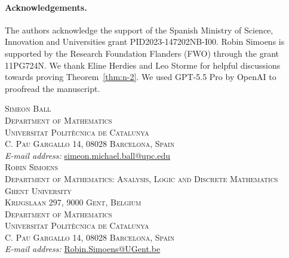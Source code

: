 \documentclass[a4paper]{article}
\theoremstyle{definition}
\begin{document}
\paragraph{Acknowledgements.}
The authors acknowledge the support of the Spanish Ministry of Science, Innovation and Universities grant PID2023-147202NB-I00.
Robin Simoens is supported by the Research Foundation Flanders (FWO) through the grant 11PG724N.
We thank Eline Herdies and Leo Storme for helpful discussions towards proving Theorem~\ref{thm:n-2}. We used GPT-5.5 Pro by OpenAI to proofread the manuscript.




\vfill
\noindent\textsc{Simeon Ball}\\
\textsc{\small Department of Mathematics}\\[-1mm]
\textsc{\small Universitat Politècnica de Catalunya}\\[-1mm]
\textsc{\small C. Pau Gargallo 14, 08028 Barcelona, Spain}\\
{\it E-mail address:} {\href{mailto:simeon.michael.ball@upc.edu}{\url{simeon.michael.ball@upc.edu}}}\\

\noindent\textsc{Robin Simoens}\\
\textsc{\small Department of Mathematics: Analysis, Logic and Discrete Mathematics}\\[-1mm]
\textsc{\small Ghent University}\\[-1mm]
\textsc{\small Krijgslaan 297, 9000 Gent, Belgium}\\
\textsc{\small Department of Mathematics}\\[-1mm]
\textsc{\small Universitat Politècnica de Catalunya}\\[-1mm]
\textsc{\small C. Pau Gargallo 14, 08028 Barcelona, Spain}\\
{\it E-mail address:} {\href{mailto:Robin.Simoens@UGent.be}{\url{Robin.Simoens@UGent.be}}}\\
\end{document}
